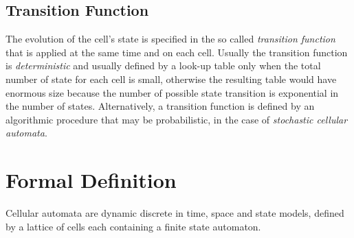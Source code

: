 \subsection{Transition Function}
The evolution of the cell's state is specified in the so called \textit{transition function} that is applied at the same time and on each cell. Usually the transition function is \textit{deterministic} and usually defined by a look-up table only when the total number of state for each cell is small, otherwise the resulting table would have enormous size because the number of possible state transition is exponential in the number of states. Alternatively, a transition function is defined by an algorithmic procedure that may be probabilistic, in the case of \textit{stochastic cellular automata}\cite{Arrighi:2013:SCA:2637657.2637659}.

\section{Formal Definition}
Cellular automata are dynamic discrete in time, space and state models, defined by a lattice of cells each containing a finite state automaton.

